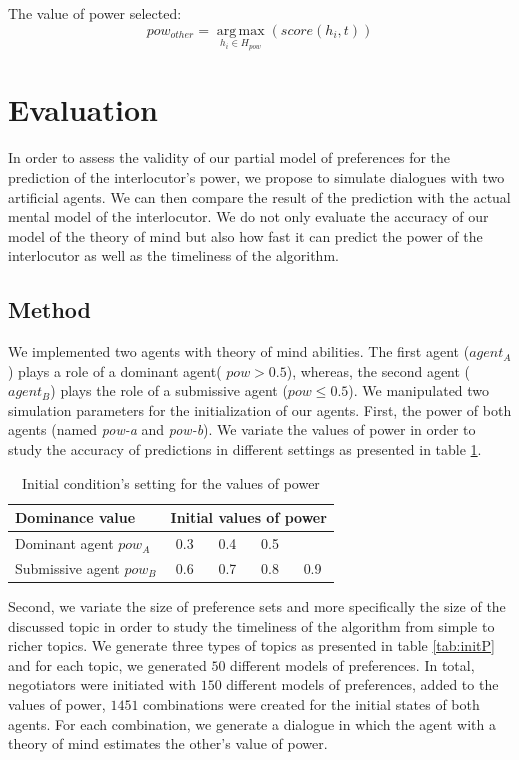 \documentclass[sigconf]{aamas}  %
\begin{document}
	The value of power selected:
	\begin{equation}
	pow_{other} = \operatorname*{arg\,max}_{h_i \in H_{pow}} ( score(h_i,t))
	\end{equation}
	
	
	\section{Evaluation}
	In order to assess the validity of our partial model of preferences for the prediction of the interlocutor's power, we propose to simulate dialogues with two artificial agents. We can then compare the result of the prediction with the actual mental model of the interlocutor. We do not only evaluate the accuracy of our model of the theory of mind but also how fast it can predict the power of the interlocutor as well as the timeliness of the algorithm.
	
	\subsection{Method}
	We implemented two agents with theory of mind abilities.
	The first agent ($agent_A$) plays a role of a dominant agent( $pow > 0.5$), whereas, the second agent ($agent_B$) plays the role of a submissive agent ($pow \leq 0.5$). 
	We manipulated two simulation parameters for the initialization of our agents. First, the power of both agents (named \emph{pow-a} and \emph{pow-b}). We variate the values of power in order to study the accuracy of predictions in different settings as presented in table \ref{tab:powsettings}.
		\begin{table}[t]
			\centering
			\caption{Initial condition's setting for the values of power} 
			\begin{tabular}{|l|cccc|}
				\hline 
				\textbf{Dominance value } &	\multicolumn{4}{c|}{ Initial values of power } \\
				\hline
				Dominant agent $pow_A$ & 0.3 & 0.4 & 0.5 &  \\
				\hline
				Submissive agent $pow_B$ & 0.6 & 0.7 & 0.8 & 0.9\\
				\hline
			\end{tabular}
			
			\label{tab:powsettings}
		\end{table}
		
	Second, we variate the size of preference sets and more specifically the size of the discussed topic in order to study the timeliness of the algorithm from simple to richer topics. We generate three types of topics as presented in table \ref{tab:initP} and for each topic, we generated $50$ different models of preferences. In total, negotiators were initiated with $150$ different models of preferences, added to the values of power,  $1451$ combinations were created for the initial states of both agents. For each combination, we generate a dialogue in which the agent with a theory of mind estimates the other's value of power.
\end{document}
